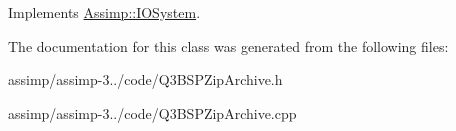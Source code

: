 Implements \hyperlink{class_assimp_1_1_i_o_system_ac512ece3b0701de5682553007a4c0816}{Assimp\+::\+I\+O\+System}.



The documentation for this class was generated from the following files\+:\begin{DoxyCompactItemize}
\item 
assimp/assimp-\/3../code/Q3\+B\+S\+P\+Zip\+Archive.\+h\item 
assimp/assimp-\/3../code/Q3\+B\+S\+P\+Zip\+Archive.\+cpp\end{DoxyCompactItemize}
